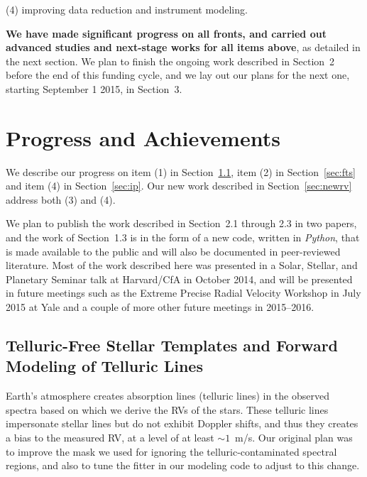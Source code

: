 \documentclass[12pt]{article}
\def\mps{m/s}
\begin{document}
(4) improving data reduction and instrument modeling.

{\bf We have made significant progress on all fronts, and carried out
  advanced studies and next-stage works for all items above}, as
detailed in the next section. We plan to finish the ongoing work
described in Section~2 before the end of this funding cycle, and we
lay out our plans for the next one, starting September 1 2015, in
Section~3.


\vspace{-10pt}
\section{Progress and Achievements}
\vspace{-5pt}

We describe our progress on item (1) in Section~\ref{sec:tell}, item
(2) in Section~\ref{sec:fts} and item (4) in Section~\ref{sec:ip}. Our
new work described in Section~\ref{sec:newrv} address both (3) and
(4).

We plan to publish the work described in Section~2.1 through 2.3 in
two papers, and the work of Section~1.3 is in the form of a new code,
written in {\it Python}, that is made available to the public and will
also be documented in peer-reviewed literature. Most of the work
described here was presented in a Solar, Stellar, and Planetary
Seminar talk at Harvard/CfA in October 2014, and will be presented in
future meetings such as the Extreme Precise Radial Velocity Workshop
in July 2015 at Yale and a couple of more other future meetings in
2015--2016.


\vspace{-10pt}
\subsection{Telluric-Free Stellar Templates and Forward Modeling of
  Telluric Lines}\label{sec:tell}
\vspace{-5pt}

Earth's atmosphere creates absorption lines (telluric lines) in the
observed spectra based on which we derive the RVs of the stars. These
telluric lines impersonate stellar lines but do not exhibit Doppler
shifts, and thus they creates a bias to the measured RV, at a level of
at least $\sim1$~\mps. Our original plan was to improve the mask we
used for ignoring the telluric-contaminated spectral regions, and also to
tune the fitter in our modeling code to adjust to this change.
\end{document}
